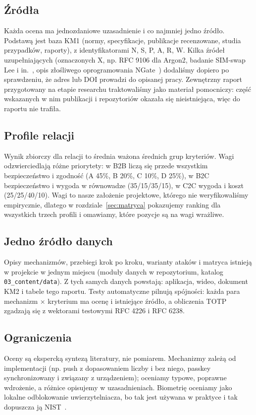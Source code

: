 \documentclass[11pt,a4paper]{article}
\begin{document}
\subsection{Źródła}
Każda ocena ma jednozdaniowe uzasadnienie i co najmniej jedno źródło. Podstawą jest baza KM1 (normy, specyfikacje, publikacje recenzowane, studia przypadków, raporty), z identyfikatorami N, S, P, A, R, W. Kilka źródeł uzupełniających (oznaczonych X, np. RFC 9106 dla Argon2, badanie SIM-swap Lee i in.~\cite{X2}, opis złośliwego oprogramowania NGate~\cite{X6}) dodaliśmy dopiero po sprawdzeniu, że adres lub DOI prowadzi do opisanej pracy. Zewnętrzny raport przygotowany na etapie researchu traktowaliśmy jako materiał pomocniczy: część wskazanych w nim publikacji i repozytoriów okazała się nieistniejąca, więc do raportu nie trafiła.

\subsection{Profile relacji}
Wynik zbiorczy dla relacji to średnia ważona średnich grup kryteriów. Wagi odzwierciedlają różne priorytety: w B2B liczą się przede wszystkim bezpieczeństwo i zgodność (A 45\%, B 20\%, C 10\%, D 25\%), w B2C bezpieczeństwo i wygoda w równowadze (35/15/35/15), w C2C wygoda i koszt (25/25/40/10). Wagi to nasze założenie projektowe, którego nie weryfikowaliśmy empirycznie, dlatego w rozdziale~\ref{sec:matryca} pokazujemy ranking dla wszystkich trzech profili i omawiamy, które pozycje są na wagi wrażliwe.

\subsection{Jedno źródło danych}
Opisy mechanizmów, przebiegi krok po kroku, warianty ataków i matryca istnieją w projekcie w jednym miejscu (moduły danych w repozytorium, katalog \texttt{03\_content/data}). Z tych samych danych powstają: aplikacja, wideo, dokument KM2 i tabele tego raportu. Testy automatyczne pilnują spójności: każda para mechanizm × kryterium ma ocenę i istniejące źródło, a obliczenia TOTP zgadzają się z wektorami testowymi RFC 4226 i RFC 6238.

\subsection{Ograniczenia}
Oceny są ekspercką syntezą literatury, nie pomiarem. Mechanizmy zależą od implementacji (np. push z dopasowaniem liczby i bez niego, passkey synchronizowany i związany z urządzeniem); oceniamy typowe, poprawne wdrożenie, a różnice opisujemy w uzasadnieniach. Biometrię oceniamy jako lokalne odblokowanie uwierzytelniacza, bo tak jest używana w praktyce i tak dopuszcza ją NIST~\cite{N1}.
\end{document}
